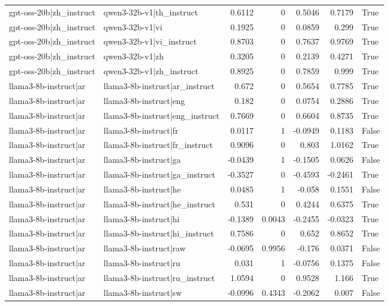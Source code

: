 \begin{table}
\begin{tabular}{l l r r r r l}
gpt-oss-20b|zh_instruct & qwen3-32b-v1|th_instruct & 0.6112 & 0 & 0.5046 & 0.7179 & True \\
gpt-oss-20b|zh_instruct & qwen3-32b-v1|vi & 0.1925 & 0 & 0.0859 & 0.299 & True \\
gpt-oss-20b|zh_instruct & qwen3-32b-v1|vi_instruct & 0.8703 & 0 & 0.7637 & 0.9769 & True \\
gpt-oss-20b|zh_instruct & qwen3-32b-v1|zh & 0.3205 & 0 & 0.2139 & 0.4271 & True \\
gpt-oss-20b|zh_instruct & qwen3-32b-v1|zh_instruct & 0.8925 & 0 & 0.7859 & 0.999 & True \\
llama3-8b-instruct|ar & llama3-8b-instruct|ar_instruct & 0.672 & 0 & 0.5654 & 0.7785 & True \\
llama3-8b-instruct|ar & llama3-8b-instruct|eng & 0.182 & 0 & 0.0754 & 0.2886 & True \\
llama3-8b-instruct|ar & llama3-8b-instruct|eng_instruct & 0.7669 & 0 & 0.6604 & 0.8735 & True \\
llama3-8b-instruct|ar & llama3-8b-instruct|fr & 0.0117 & 1 & -0.0949 & 0.1183 & False \\
llama3-8b-instruct|ar & llama3-8b-instruct|fr_instruct & 0.9096 & 0 & 0.803 & 1.0162 & True \\
llama3-8b-instruct|ar & llama3-8b-instruct|ga & -0.0439 & 1 & -0.1505 & 0.0626 & False \\
llama3-8b-instruct|ar & llama3-8b-instruct|ga_instruct & -0.3527 & 0 & -0.4593 & -0.2461 & True \\
llama3-8b-instruct|ar & llama3-8b-instruct|he & 0.0485 & 1 & -0.058 & 0.1551 & False \\
llama3-8b-instruct|ar & llama3-8b-instruct|he_instruct & 0.531 & 0 & 0.4244 & 0.6375 & True \\
llama3-8b-instruct|ar & llama3-8b-instruct|hi & -0.1389 & 0.0043 & -0.2455 & -0.0323 & True \\
llama3-8b-instruct|ar & llama3-8b-instruct|hi_instruct & 0.7586 & 0 & 0.652 & 0.8652 & True \\
llama3-8b-instruct|ar & llama3-8b-instruct|raw & -0.0695 & 0.9956 & -0.176 & 0.0371 & False \\
llama3-8b-instruct|ar & llama3-8b-instruct|ru & 0.031 & 1 & -0.0756 & 0.1375 & False \\
llama3-8b-instruct|ar & llama3-8b-instruct|ru_instruct & 1.0594 & 0 & 0.9528 & 1.166 & True \\
llama3-8b-instruct|ar & llama3-8b-instruct|sw & -0.0996 & 0.4343 & -0.2062 & 0.007 & False \\

\end{tabular}
\end{table}
